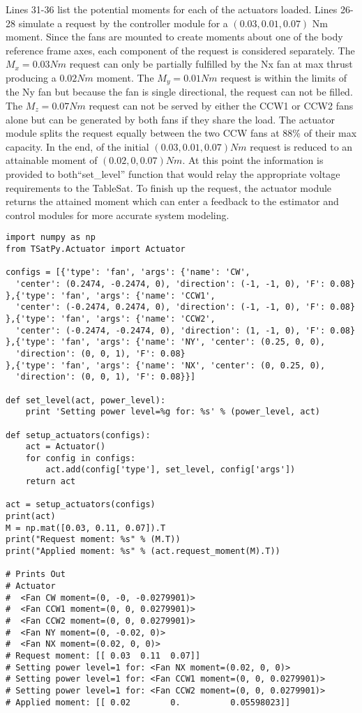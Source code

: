 Lines 31-36 list the potential moments for each of the actuators loaded.  Lines 26-28 simulate a request by the controller module for a $(0.03, 0.01, 0.07)$ Nm moment.  Since the fans are mounted to create moments about one of the body reference frame axes, each component of the request is considered separately.  The $M_x = 0.03 Nm$ request can only be partially fulfilled by the Nx fan at max thrust producing a $0.02 Nm$ moment.  The $M_y = 0.01 Nm$ request is within the limits of the Ny fan but because the fan is single directional, the request can not be filled.  The $M_z = 0.07 Nm$ request can not be served by either the CCW1 or CCW2 fans alone but can be generated by both fans if they share the load.  The actuator module splits the request equally between the two CCW fans at 88\% of their max capacity.  In the end, of the initial $(0.03, 0.01, 0.07) Nm$ request is reduced to an attainable moment of $(0.02, 0, 0.07) Nm$.  At this point the information is provided to both``set\_level'' function that would relay the appropriate voltage requirements to the TableSat.  To finish up the request, the actuator module returns the attained moment which can enter a feedback to the estimator and control modules for more accurate system modeling.

\begin{singlespace}
  \begin{verbatim}
import numpy as np
from TSatPy.Actuator import Actuator

configs = [{'type': 'fan', 'args': {'name': 'CW',
  'center': (0.2474, -0.2474, 0), 'direction': (-1, -1, 0), 'F': 0.08}
},{'type': 'fan', 'args': {'name': 'CCW1',
  'center': (-0.2474, 0.2474, 0), 'direction': (-1, -1, 0), 'F': 0.08}
},{'type': 'fan', 'args': {'name': 'CCW2',
  'center': (-0.2474, -0.2474, 0), 'direction': (1, -1, 0), 'F': 0.08}
},{'type': 'fan', 'args': {'name': 'NY', 'center': (0.25, 0, 0),
  'direction': (0, 0, 1), 'F': 0.08}
},{'type': 'fan', 'args': {'name': 'NX', 'center': (0, 0.25, 0),
  'direction': (0, 0, 1), 'F': 0.08}}]

def set_level(act, power_level):
    print 'Setting power level=%g for: %s' % (power_level, act)

def setup_actuators(configs):
    act = Actuator()
    for config in configs:
        act.add(config['type'], set_level, config['args'])
    return act

act = setup_actuators(configs)
print(act)
M = np.mat([0.03, 0.11, 0.07]).T
print("Request moment: %s" % (M.T))
print("Applied moment: %s" % (act.request_moment(M).T))

# Prints Out
# Actuator
#  <Fan CW moment=(0, -0, -0.0279901)>
#  <Fan CCW1 moment=(0, 0, 0.0279901)>
#  <Fan CCW2 moment=(0, 0, 0.0279901)>
#  <Fan NY moment=(0, -0.02, 0)>
#  <Fan NX moment=(0.02, 0, 0)>
# Request moment: [[ 0.03  0.11  0.07]]
# Setting power level=1 for: <Fan NX moment=(0.02, 0, 0)>
# Setting power level=1 for: <Fan CCW1 moment=(0, 0, 0.0279901)>
# Setting power level=1 for: <Fan CCW2 moment=(0, 0, 0.0279901)>
# Applied moment: [[ 0.02        0.          0.05598023]]
  \end{verbatim}
\nocite{minted}
\end{singlespace}

